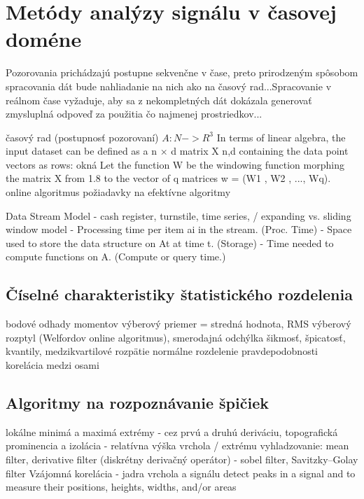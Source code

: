 \section{Metódy analýzy signálu v časovej doméne}
Pozorovania prichádzajú postupne sekvenčne v čase, preto prirodzeným spôsobom spracovania dát bude nahliadanie na nich
ako na časový rad...Spracovanie v reálnom čase vyžaduje, aby sa z nekompletných dát dokázala generovať zmysluplná odpoveď
za použitia čo najmenej prostriedkov...

časový rad (postupnosť pozorovaní) $A: N -> R^3$
In terms of linear algebra, the input dataset can be defined as a n × d matrix X n,d containing the data point vectors as rows:
okná Let the function W be the windowing function morphing the matrix X from 1.8 to the vector of q matrices
w = (W1 , W2 , ..., Wq).
\cite{practical-time-series}
online algoritmus
\cite{data-streams}
\cite{online-anomaly-detection}
požiadavky na efektívne algoritmy

Data Stream Model - cash register, turnstile, time series, / expanding vs. sliding window model
- Processing time per item ai in the stream. (Proc. Time)
- Space used to store the data structure on At at time t. (Storage)
- Time needed to compute functions on A. (Compute or query time.)
\newpage

\subsection{Číselné charakteristiky štatistického rozdelenia}
bodové odhady momentov
výberový priemer = stredná hodnota,
RMS
výberový rozptyl (Welfordov online algoritmus), smerodajná odchýlka
šikmosť,
špicatosť,
kvantily, medzikvartilové rozpätie
normálne rozdelenie pravdepodobnosti
korelácia medzi osami

\subsection{Algoritmy na rozpoznávanie špičiek}
\label{peak-detection}
lokálne minimá a maximá extrémy - cez prvú a druhú deriváciu,
topografická prominencia a izolácia - relatívna výška vrchola / extrému
vyhladzovanie: mean filter, derivative filter (diskrétny derivačný operátor) - sobel filter, Savitzky–Golay filter
Vzájomná korelácia - jadra vrchola a signálu
detect peaks in a signal and to measure their positions, heights, widths, and/or areas

